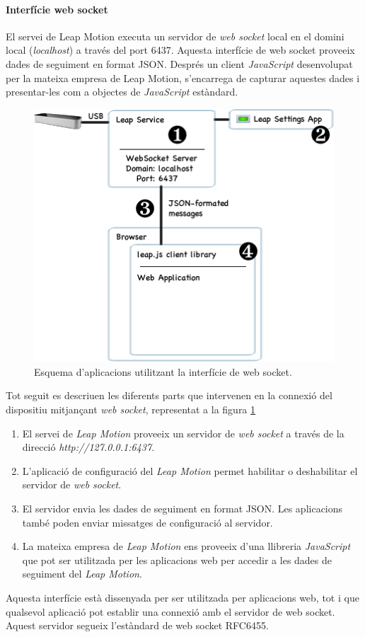 \documentclass[12pt,a4paper,catalan]{article}
\begin{document}
	\paragraph{Interfície web socket}
	El servei de Leap Motion executa un servidor de \textit{web socket} local en el domini local (\textit{localhost}) a través del port 6437. Aquesta interfície de web socket proveeix dades de seguiment en format JSON. Després un client \textit{JavaScript} desenvolupat per la mateixa empresa de Leap Motion, s'encarrega de capturar aquestes dades i presentar-les com a objectes de \textit{JavaScript} estàndard.
	\begin{figure}[H]
		\includegraphics[width=\textwidth,keepaspectratio]{websocket-interface.png}
		\centering
		\caption{Esquema d'aplicacions utilitzant la interfície de web socket.}
		\label{fig:websocket-interface}
	\end{figure}
	Tot seguit es descriuen les diferents parts que intervenen en la connexió del dispositiu mitjançant \textit{web socket}, representat a la figura \ref{fig:websocket-interface}
	\begin{enumerate}
		\item El servei de \textit{Leap Motion} proveeix un servidor de \textit{web socket} a través de la direcció \textit{http://127.0.0.1:6437}.
		\item L'aplicació de configuració del \textit{Leap Motion} permet habilitar o deshabilitar el servidor de \textit{web socket}.
		\item El servidor envia les dades de seguiment en format JSON. Les aplicacions també poden enviar missatges de configuració al servidor.
		\item La mateixa empresa de \textit{Leap Motion} ens proveeix d'una llibreria \textit{JavaScript} que pot ser utilitzada per les aplicacions web per accedir a les dades de seguiment del \textit{Leap Motion}.
	\end{enumerate}
	Aquesta interfície està dissenyada per ser utilitzada per aplicacions web, tot i que qualsevol aplicació pot establir una connexió amb el servidor de web socket. Aquest servidor segueix l'estàndard de web socket RFC6455.
\end{document}
